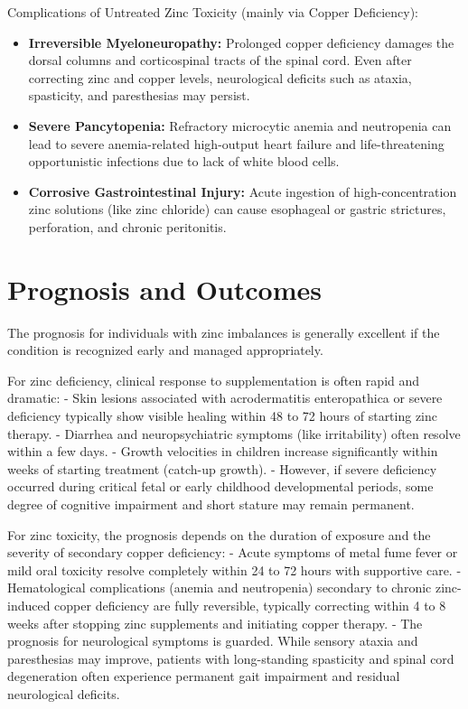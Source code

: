 Complications of Untreated Zinc Toxicity (mainly via Copper Deficiency):
\begin{itemize}
    \item \textbf{Irreversible Myeloneuropathy:} Prolonged copper deficiency damages the dorsal columns and corticospinal tracts of the spinal cord. Even after correcting zinc and copper levels, neurological deficits such as ataxia, spasticity, and paresthesias may persist.
    \item \textbf{Severe Pancytopenia:} Refractory microcytic anemia and neutropenia can lead to severe anemia-related high-output heart failure and life-threatening opportunistic infections due to lack of white blood cells.
    \item \textbf{Corrosive Gastrointestinal Injury:} Acute ingestion of high-concentration zinc solutions (like zinc chloride) can cause esophageal or gastric strictures, perforation, and chronic peritonitis.
\end{itemize}

\section*{Prognosis and Outcomes}
The prognosis for individuals with zinc imbalances is generally excellent if the condition is recognized early and managed appropriately.

For zinc deficiency, clinical response to supplementation is often rapid and dramatic:
- Skin lesions associated with acrodermatitis enteropathica or severe deficiency typically show visible healing within 48 to 72 hours of starting zinc therapy.
- Diarrhea and neuropsychiatric symptoms (like irritability) often resolve within a few days.
- Growth velocities in children increase significantly within weeks of starting treatment (catch-up growth).
- However, if severe deficiency occurred during critical fetal or early childhood developmental periods, some degree of cognitive impairment and short stature may remain permanent.

For zinc toxicity, the prognosis depends on the duration of exposure and the severity of secondary copper deficiency:
- Acute symptoms of metal fume fever or mild oral toxicity resolve completely within 24 to 72 hours with supportive care.
- Hematological complications (anemia and neutropenia) secondary to chronic zinc-induced copper deficiency are fully reversible, typically correcting within 4 to 8 weeks after stopping zinc supplements and initiating copper therapy.
- The prognosis for neurological symptoms is guarded. While sensory ataxia and paresthesias may improve, patients with long-standing spasticity and spinal cord degeneration often experience permanent gait impairment and residual neurological deficits.

